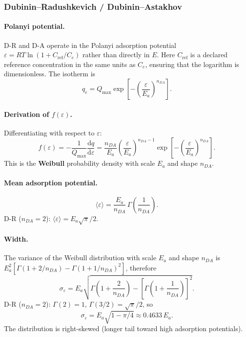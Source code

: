 \documentclass[journal=jacsat,manuscript=article]{achemso}
\begin{document}
\subsubsection{Dubinin--Radushkevich / Dubinin--Astakhov}

\paragraph{Polanyi potential.}
D-R and D-A operate in the Polanyi adsorption potential
$\varepsilon = RT\ln(1 + C_{\mathrm{ref}}/C_e)$ rather than directly in $E$.
Here \(C_{\mathrm{ref}}\) is a declared reference concentration in the same
units as \(C_e\), ensuring that the logarithm is dimensionless.
The isotherm is
\begin{equation}
	q_e = Q_{\max}\exp\!\left[-\!\left(\frac{\varepsilon}{E_a}\right)^{\!n_{DA}}\right].
\end{equation}

\paragraph{Derivation of $f(\varepsilon)$.}
Differentiating with respect to $\varepsilon$:
\begin{equation}
	f(\varepsilon) = -\frac{1}{Q_{\max}}\frac{\mathrm{d}q}{\mathrm{d}\varepsilon}
	= \frac{n_{DA}}{E_a}\left(\frac{\varepsilon}{E_a}\right)^{n_{DA}-1}
	\exp\!\left[-\!\left(\frac{\varepsilon}{E_a}\right)^{n_{DA}}\right].
	\label{eq:si_fE_DA}
\end{equation}
This is the \textbf{Weibull} probability density with scale $E_a$
and shape $n_{DA}$.

\paragraph{Mean adsorption potential.}
\begin{equation}
	\langle\varepsilon\rangle
	= \frac{E_a}{n_{DA}}\,\Gamma\!\left(\frac{1}{n_{DA}}\right).
\end{equation}
D-R ($n_{DA}=2$): $\langle\varepsilon\rangle = E_a\sqrt{\pi}/2$.

\paragraph{Width.}
The variance of the Weibull distribution with scale $E_a$ and shape $n_{DA}$ is
$E_a^2[\Gamma(1+2/n_{DA})-\Gamma(1+1/n_{DA})^2]$, therefore
\begin{equation}
	\sigma_\varepsilon
	= E_a\sqrt{\Gamma\!\left(1+\frac{2}{n_{DA}}\right)
	           - \left[\Gamma\!\left(1+\frac{1}{n_{DA}}\right)\right]^{2}}.
	\label{eq:si_sigmaE_DA}
\end{equation}
D-R ($n_{DA}=2$): $\Gamma(2)=1$, $\Gamma(3/2)=\sqrt{\pi}/2$, so
\begin{equation}
	\sigma_\varepsilon = E_a\sqrt{1-\pi/4} \approx 0.4633\,E_a.
\end{equation}
The distribution is right-skewed (longer tail toward high adsorption potentials).
\end{document}
